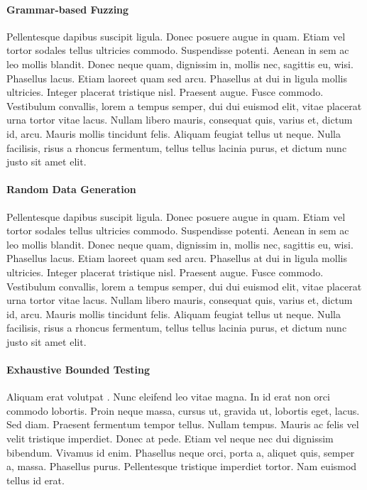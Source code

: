 \documentclass[acmsmall, anonymous]{acmart}
\begin{document}
\paragraph{Grammar-based Fuzzing}

Pellentesque dapibus suscipit ligula. Donec posuere augue in quam. Etiam vel
tortor sodales tellus ultricies commodo. Suspendisse potenti. Aenean in sem ac
leo mollis blandit. Donec neque quam, dignissim in, mollis nec, sagittis eu,
wisi. Phasellus lacus. Etiam laoreet quam sed arcu. Phasellus at dui in ligula
mollis ultricies. Integer placerat tristique nisl. Praesent augue. Fusce
commodo. Vestibulum convallis, lorem a tempus semper, dui dui euismod elit,
vitae placerat urna tortor vitae lacus. Nullam libero mauris, consequat quis,
varius et, dictum id, arcu. Mauris mollis tincidunt felis. Aliquam feugiat
tellus ut neque. Nulla facilisis, risus a rhoncus fermentum, tellus tellus
lacinia purus, et dictum nunc justo sit amet elit.

\paragraph{Random Data Generation}


Pellentesque dapibus suscipit ligula. Donec posuere augue in quam. Etiam vel
tortor sodales tellus ultricies commodo. Suspendisse potenti. Aenean in sem ac
leo mollis blandit. Donec neque quam, dignissim in, mollis nec, sagittis eu,
wisi. Phasellus lacus. Etiam laoreet quam sed arcu. Phasellus at dui in ligula
mollis ultricies. Integer placerat tristique nisl. Praesent augue. Fusce
commodo. Vestibulum convallis, lorem a tempus semper, dui dui euismod elit,
vitae placerat urna tortor vitae lacus. Nullam libero mauris, consequat quis,
varius et, dictum id, arcu. Mauris mollis tincidunt felis. Aliquam feugiat
tellus ut neque. Nulla facilisis, risus a rhoncus fermentum, tellus tellus
lacinia purus, et dictum nunc justo sit amet elit.

\paragraph{Exhaustive Bounded Testing}

Aliquam erat volutpat \citep{devai2013edsl}. Nunc eleifend leo vitae magna. In id
erat non orci commodo lobortis. Proin neque massa, cursus ut, gravida ut,
lobortis eget, lacus. Sed diam. Praesent fermentum tempor tellus. Nullam tempus.
Mauris ac felis vel velit tristique imperdiet. Donec at pede. Etiam vel neque
nec dui dignissim bibendum. Vivamus id enim. Phasellus neque orci, porta a,
aliquet quis, semper a, massa. Phasellus purus. Pellentesque tristique imperdiet
tortor. Nam euismod tellus id erat.
\end{document}
